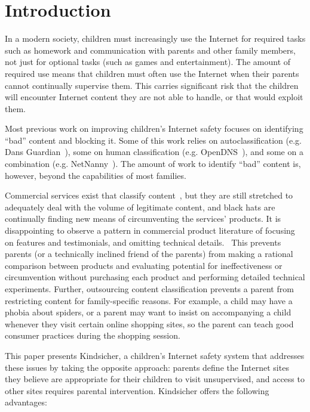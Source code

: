 

\vspace{20mm}

\section{Introduction}
\nopagebreak
In a modern society, children must increasingly use the Internet for required
tasks such as homework and communication with parents and other family
members, not just for optional tasks (such as games and entertainment).
%
The amount of required use means that children must often use the Internet
when their parents cannot continually supervise them.
%
This carries significant risk that the children will encounter Internet
content they are not able to handle, or that would exploit them.

Most previous work on improving children's Internet safety focuses on
identifying ``bad'' content and blocking it. Some of this work relies
on autoclassification (e.g. Dans Guardian~\cite{dansguardian}), some on
human classification (e.g. OpenDNS~\cite{opendns}), and some on a
combination (e.g. NetNanny~\cite{netnanny}).
%
The amount of work to identify ``bad'' content is, however, beyond the
capabilities of most families.

Commercial services exist that classify content~\cite{opendns, netnanny},
but they are still stretched to adequately deal with the volume of legitimate
content, and black hats are continually finding new means of circumventing the
services' products.
%
It is disappointing to observe a pattern in commercial product literature of
focusing on features and testimonials, and omitting technical
details.~\cite{opendns, kidlogger, mcafee}
%
This prevents parents (or a technically inclined friend of the parents) from
making a rational comparison between products and evaluating potential for
ineffectiveness or circumvention without purchasing each product and
performing detailed technical experiments.
%
Further, outsourcing content classification prevents a parent from restricting
content for family-specific reasons.
%
For example, a child may have a phobia about spiders, or a parent may want to
insist on accompanying a child whenever they visit certain online shopping
sites, so the parent can teach good consumer practices during the shopping
session.

This paper presents Kindsicher, a children's Internet safety system
that addresses these issues by taking the opposite approach: parents
define the Internet sites they believe are appropriate for their
children to visit unsupervised, and access to other sites requires
parental intervention.
%
Kindsicher offers the following advantages:

